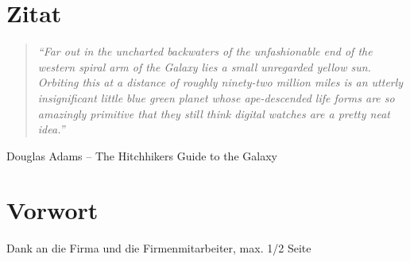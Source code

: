 %
\chapter*{Zitat} %
\begin{center}
\begin{minipage}{12cm}
\begin{quotation}
\textit{\enquote{Far out in the uncharted backwaters of the unfashionable
end of the western spiral arm of the Galaxy lies a small unregarded
yellow sun. Orbiting this at a distance of roughly ninety-two
million miles is an utterly insignificant little blue green planet
whose ape-descended life forms are so amazingly primitive that they
still think digital watches are a pretty neat idea.}}
\end{quotation}
\hfill \textsf Douglas Adams -- The Hitchhikers Guide to the Galaxy
\end{minipage}
\end{center}
\newpage{}
\chapter*{Vorwort} %

Dank an die Firma und die Firmenmitarbeiter, max. 1/2 Seite

\newpage
